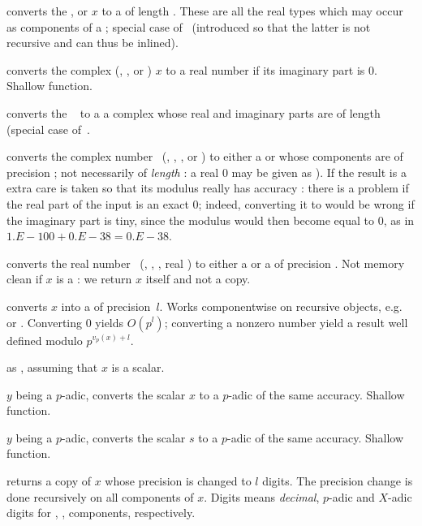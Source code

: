  converts the
,  or  $x$ to a  of length .
These are all the real types which may occur as components of a
; special case of~ (introduced so that the latter is
not recursive and can thus be inlined).

 converts the complex (, ,
 or ) $x$ to a real number if its imaginary part is 0.
Shallow function.

converts the ~ to a
a complex whose real and imaginary parts are  of length 
(special case of~.

 converts the complex number~
(, , ,  or ) to either
a  or  whose components are  of precision
; not necessarily of \emph{length} : a real $0$ may be
given as ). If the result is a  extra care is
taken so that its modulus really has accuracy : there is a problem
if the real part of the input is an exact $0$; indeed, converting it to
 would be wrong if the imaginary part is tiny, since the
modulus would then become equal to $0$, as in $1.E-100 + 0.E-38 = 0.E-38$.

 converts the real number~
(, , , real ) to either
a  or a  of precision . Not memory clean
if $x$ is a : we return $x$ itself and not a copy.

 converts $x$ into a 
of precision~$l$. Works componentwise on recursive objects,
e.g.~ or . Converting $0$ yields $O(p^l)$; converting a
nonzero number yield a result well defined modulo $p^{v_p(x) + l}$.

 as , assuming that $x$
is a scalar.

 $y$ being a $p$-adic, converts the scalar $x$
to a $p$-adic of the same accuracy. Shallow function.

 $y$ being a $p$-adic, converts the scalar $s$
to a $p$-adic of the same accuracy. Shallow function.

 returns a copy of $x$ whose precision is
changed to $l$ digits. The precision change is done recursively on all
components of $x$. Digits means \emph{decimal}, $p$-adic and $X$-adic digits
for , ,  components, respectively.

